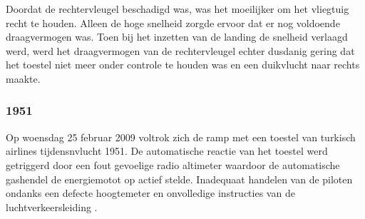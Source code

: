 \documentclass{article}
\begin{document}
	Doordat de rechtervleugel beschadigd was, was het moeilijker om het vliegtuig recht te houden. Alleen de hoge snelheid zorgde ervoor dat er nog voldoende draagvermogen was. Toen bij het inzetten van de landing de snelheid verlaagd werd, werd het draagvermogen van de rechtervleugel echter dusdanig gering dat het toestel niet meer onder controle te houden was en een duikvlucht naar rechts maakte.
	\cite{aviationsafety04101992airplaneCrashBijlmer}
	\cite{catsr25022009Boeing737AmsterdamCrash}
	\cite{BijlmerrampWiki}
	\cite{ElAlFlight1862}
	\cite{bijlmerReconstruction}
	\cite{bijlmer5}
	\cite{dataReconstruct}
	\cite{dataReconstructBijlmermeerairplane1992}
	\cite{dataReconstructBijlmermeerairplane}
	\cite{dataReconstructBijlmermeerairplaneSimul}
	\cite{smailiDataReconstruction}
	\cite{smailiDataReconstructionBijlmer}
	\cite{pilotedSimulator}
	\cite{accidentReport}
	\subsubsection{1951}
	\newline \indent  Op woensdag 25 februar 2009 voltrok zich de  ramp met een toestel van turkisch airlines tijdensnvlucht 1951.
	De automatische reactie van het toestel werd getriggerd door een fout gevoelige radio altimeter waardoor de automatische gashendel de energiemotot op actief stelde.
	Inadequaat handelen van de piloten ondanks een defecte hoogtemeter en onvolledige instructies van de luchtverkeersleiding
	\cite{zuilen23022019Tijdlijnpoldercrash}
	\cite{wikinews04032009techfoutailines1951}
	\cite{luchtvaartnieuws21012020boeing737conclusies}
	\cite{adformatie280220209communicatiegebreken}
	\cite{spinnael25022009onderzoekpolderbaancrash}
	\cite{crashTurkishAirlines}
	\cite{flightradar24}
	\cite{flightstatstracker}. 
\end{document}
